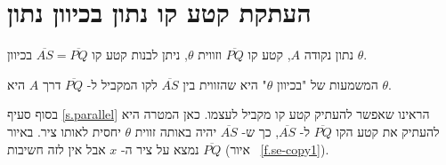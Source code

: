 \section{העתקת קטע קו נתון בכיוון נתון}\label{s.direction}

\begin{theorem}\label{thm.angle}
נתון נקודה
$A$,
קטע קו
$\overline{PQ}$
וזווית
$\theta$,
ניתן לבנות קטע קו
$\overline{AS}=\overline{PQ}$
בכיוון 
$\theta$.
\end{theorem}

%

המשמעות של "בכיוון 
$\theta$"
היא שהזווית בין 
$\overline{AS}$
לקו המקביל ל-%
$\overline{PQ}$
דרך
$A$
היא
$\theta$.

בסוף סעיף
\ref{s.parallel}
הראינו שאפשר להעתיק קטע קו מקביל לעצמו. כאן המטרה היא להעתיק את קטע הקו
$\overline{PQ}$
ל-%
$\overline{AS}$,
כך ש-%
$\overline{AS}$
יהיה באותה זווית
$\theta$
יחסית לאותו ציר. באיור
$\overline{PQ}$
נמצא על ציר ה-%
$x$
אבל אין לזה חשיבות
(איור%
~\ref{f.se-copy1}).


